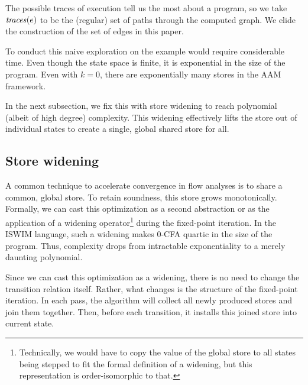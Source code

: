 \documentclass[preprint,onecolumn,9pt]{sigplanconf} %
\newcommand{\naive}{naive}
\begin{document}
The possible traces of execution tell us the most about a program, so
we take $\mathit{traces}(e)$ to be the (regular) set of paths through the
computed graph. We elide the construction of the set of edges in this paper.

To conduct this \naive{} exploration on the \Church{} example would require
considerable time.  Even though the state space is finite, it is exponential in
the size of the program.  Even with $k = 0$, there are exponentially many
stores in the AAM framework.

In the next subsection, we fix this with store widening to reach polynomial
(albeit of high degree) complexity.
%
This widening effectively lifts the store out of individual states to create
a single, global shared store for all.


\subsection{Store widening}
\label{sec:storewiden}

A common technique to accelerate convergence in flow analyses is to share a
common, global store.
%
To retain soundness, this store grows monotonically.
%
Formally, we can cast this optimization as a second abstraction or as
the application of a widening operator\footnote{Technically, we would
  have to copy the value of the global store to all states being
  stepped to fit the formal definition of a widening, but this
  representation is order-isomorphic to that.} during the fixed-point
iteration.
%
In the ISWIM language, such a widening makes 0-CFA quartic in the size of the
program.
%
Thus, complexity drops from intractable exponentiality to a merely
daunting polynomial.

Since we can cast this optimization as a widening, there is no need to change
the transition relation itself.
%
Rather, what changes is the structure of the fixed-point iteration.
%
In each pass, the algorithm will collect all newly produced stores and join
them together.
%
Then, before each transition, it installs this joined store into current
state.
\end{document}
